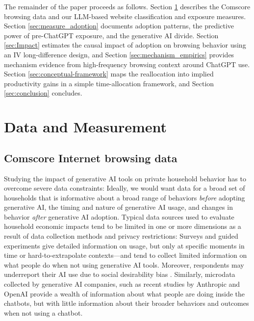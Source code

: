 \documentclass[12pt]{article}
\begin{document}
The remainder of the paper proceeds as follows. Section \ref{sec:data} describes the Comscore browsing data and our LLM-based website classification and exposure measures. Section \ref{sec:measure_adoption} documents adoption patterns, the predictive power of pre-ChatGPT exposure, and the generative AI divide. Section \ref{sec:Impact} estimates the causal impact of adoption on browsing behavior using an IV long-difference design, and Section \ref{sec:mechanism_empirics} provides mechanism evidence from high-frequency browsing context around ChatGPT use. Section \ref{sec:conceptual-framework} maps the reallocation into implied productivity gains in a simple time-allocation framework, and Section \ref{sec:conclusion} concludes.

 


\section{Data and Measurement} \label{sec:data}


\subsection{Comscore Internet browsing data}  \label{subsec:Comscore_data}

Studying the impact of generative AI tools on private household behavior has to overcome severe data constraints: Ideally, we would want data for a broad set of households that is informative about a broad range of behaviors \textit{before} adopting generative AI, the timing and nature of generative AI usage, and changes in behavior \textit{after} generative AI adoption. Typical data sources used to evaluate household economic impacts tend to be limited in one or more dimensions as a result of data collection methods and privacy restrictions: Surveys and guided experiments give detailed information on usage, but only at specific moments in time or hard-to-extrapolate contexts---and tend to collect limited information on what people do when not using generative AI tools. Moreover, respondents may underreport their AI use due to social desirability bias \citep{ling2025}. Similarly, microdata collected by generative AI companies, such as recent studies by Anthropic \citep{handa2025} and OpenAI \citep{chatterji_how_2025} provide a wealth of information about what people are doing inside the chatbots, but with little information about their broader behaviors and outcomes when not using a chatbot.
\end{document}
